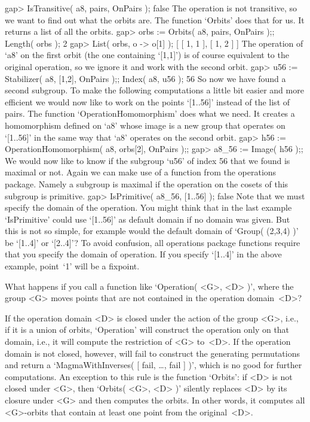 \beginexample
    gap> IsTransitive( a8, pairs, OnPairs );
    false 
\endexample
The operation is not transitive,  so we want to  find out what the orbits
are. The function `Orbits' does that for us. It returns a list of all the
orbits.
\beginexample
    gap> orbs := Orbits( a8, pairs, OnPairs );; Length( orbs );
    2
    gap> List( orbs, o -> o[1] );
    [ [ 1, 1 ], [ 1, 2 ] ]
\endexample
The operation of `a8' on the first orbit  (the one containing `[1,1]') is
of course equivalent to the original operation,  so we ignore it and work
with the second orbit.
\beginexample
    gap> u56 := Stabilizer( a8, [1,2], OnPairs );; Index( a8, u56 );
    56 
\endexample
So   now   we have  found   a  second subgroup.   To   make the following
computations a little bit easier and more efficient  we would now like to
work on the points `[1..56]'  instead of the list  of pairs. The function
`OperationHomomorphism' does what  we need.   It creates a   homomorphism
defined on `a8' whose image is a new group  that operates on `[1..56]' in
the same way that `a8' operates on the second orbit.
\beginexample
    gap> h56 := OperationHomomorphism( a8, orbs[2], OnPairs );;
    gap> a8_56 := Image( h56 );;
\endexample
We would now like to know if the subgroup `u56' of index 56 that we found
is  maximal or  not.   Again  we can make  use  of  a function  from  the
operations package.  Namely a subgroup is maximal if the operation on the
cosets of  this subgroup is primitive.
\beginexample
    gap> IsPrimitive( a8_56, [1..56] );
    false 
\endexample
Note that we  must specify the domain  of the operation. You might  think
that  in the last example   `IsPrimitive' could use `[1..56]' as  default
domain  if no domain was given.  But this is   not so simple, for example
would the  default domain of `Group(  (2,3,4) )' be `[1..4]' or `[2..4]'?
To  avoid confusion,  all  operations package  functions require that you
specify the  domain of operation. If  you  specify `[1..4]' in  the above
example, point~`1' will be a fixpoint.

\exercise What happens if  you call a function  like `Operation( <G>, <D>
)',  where the group  <G>  moves points  that are   not contained in  the
operation domain~<D>?

\answer If the  operation domain <D> is  closed  under the action  of the
group <G>, i.e., if  it is a union of  orbits, `Operation' will construct
the operation only on that domain, i.e.,  it will compute the restriction
of <G> to~<D>. If  the operation domain  is  not closed, however,  {\GAP}
will   fail to construct  the     generating permutations and return    a
`MagmaWithInverses( [ fail,  \dots,  fail  ] )',  which  is no  good  for
further computations. An exception to this rule is the function `Orbits':
if  <D> is not   closed under <G>, then    `Orbits( <G>, <D> )'  silently
replaces  <D> by its  closure under <G>  and then computes the orbits. In
other words, it  computes all <G>-orbits that contain  at least one point
from the original~<D>.

